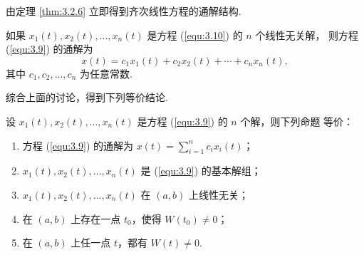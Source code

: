由定理 \ref{thm:3.2.6} 立即得到齐次线性方程的通解结构.
\begin{thm}\label{thm:3.2.7}
如果 $x_1(t),x_2(t),\dots,x_n(t)$ 是方程 (\ref{equ:3.10}) 的 $n$ 个线性无关解，
则方程 (\ref{equ:3.9}) 的通解为
\begin{equation}\label{equ:3.11}
x(t)=c_1x_1(t)+c_2x_2(t)+\cdots+c_nx_n(t),
\end{equation}
其中 $c_1,c_2,\dots,c_n$ 为任意常数.
\end{thm}

综合上面的讨论，得到下列等价结论.
\begin{thm}\label{thm:3.2.8}
设 $x_1(t),x_2(t),\dots,x_n(t)$ 是方程 (\ref{equ:3.9}) 的 $n$ 个解，则下列命题
等价：
\begin{enumerate}
\item 方程 (\ref{equ:3.9}) 的通解为
$\displaystyle x(t)=\sum_{i=1}^n c_ix_i(t)$；
\item $x_1(t),x_2(t),\dots,x_n(t)$ 是 (\ref{equ:3.9}) 的基本解组；
\item $x_1(t),x_2(t),\dots,x_n(t)$ 在 $(a,b)$ 上线性无关；
\item 在 $(a,b)$ 上存在一点 $t_0$，使得 $W(t_0)\neq0$；
\item 在 $(a,b)$ 上任一点 $t$，都有 $W(t)\neq0$.
\end{enumerate}
\end{thm}

